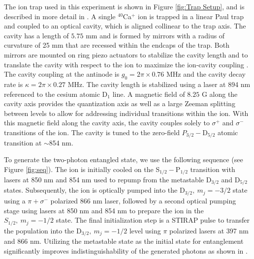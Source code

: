 \documentclass[aps,prl,twocolumn,floatfix,superscriptaddress]{revtex4-2}
\begin{document}
The ion trap used in this experiment is shown in Figure \ref{fig:Trap Setup}, and is described in more detail in \cite{Walker2018LongDistanceQFC}. A single $^{40}$Ca$^+$ ion is trapped in a linear Paul trap and coupled to an optical cavity, which is aligned collinear to the trap axis. The cavity has a length of $5.75$ mm and is formed by mirrors with a radius of curvature of 25 mm that are recessed within the endcaps of the trap.
Both mirrors are mounted on ring piezo actuators to stabilize the cavity length and to translate the cavity with respect to the ion to maximize the ion-cavity coupling \cite{Multi_Ion}.
The cavity coupling at the antinode is $g_0=2\pi \times 0.76$ MHz and the cavity decay rate is $\kappa = 2\pi \times 0.27 $ MHz.
The cavity length is stabilized using a laser at 894 nm  referenced to the cesium atomic D$_1$ line.
A magnetic field of $8.25$ G along the cavity axis provides the quantization axis as well as a large Zeeman splitting between levels to allow for addressing individual transitions within the ion. With this magnetic field along the cavity axis, the cavity couples solely to $\sigma^+$ and $\sigma^-$ transitions of the ion. The cavity is tuned to the zero-field $P_{3/2}- \mathrm{D}_{5/2}$ atomic transition at $\sim$854 nm.

To generate the two-photon entangled state, we use the following sequence (see Figure \ref{fig:seq}). The ion is initially cooled on the S$_{1/2}-$P$_{1/2}$ transition with lasers at 850 nm and 854 nm used to repump from the metastable $\mathrm{D}_{3/2}$ and $\mathrm{D}_{5/2}$ states. Subsequently, the ion is optically pumped into the $\mathrm{D}_{3/2},\: m_j=-3/2$ state using a $\pi + \sigma^-$ polarized 866 nm laser, followed by a second optical pumping stage using lasers at  850 nm and 854 nm to prepare the ion in the $S_{1/2},\:m_j=-1/2$ state. The final initialization step is a  STIRAP pulse to transfer the population into the $\mathrm{D}_{3/2},\:m_j=-1/2$ level using $\pi$ polarized lasers at 397 nm and 866 nm. Utilizing the metastable state as the initial state for entanglement significantly improves indistinguishability of the generated photons  as shown in \cite{Walker2020}.
\end{document}
